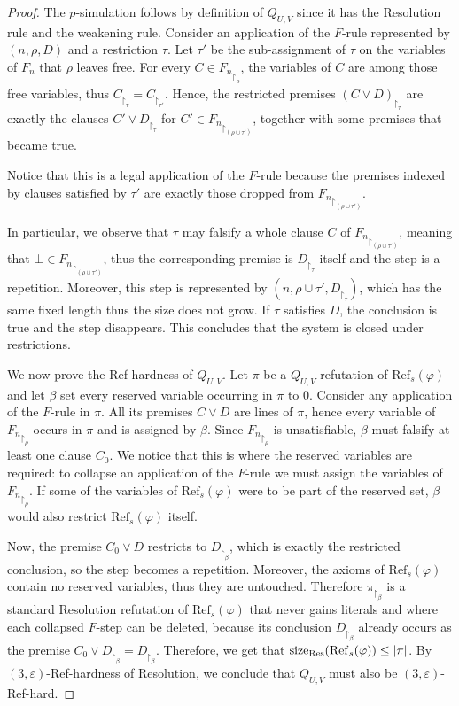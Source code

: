 \begin{proof}
    The $p$-simulation follows by definition of $Q_{U,V}$ since it has the Resolution rule and the weakening rule. Consider an application of the $F$-rule represented by $(n,\rho,D)$ and a restriction $\tau$. Let $\tau'$ be the sub-assignment of $\tau$ on the variables of $F_n$ that $\rho$ leaves free. For every $C\in {F_n}_{\upharpoonright_\rho}$, the variables of $C$ are among those free variables, thus $C_{\upharpoonright_\tau}=C_{\upharpoonright_{\tau'}}$. Hence, the restricted premises $(C \lor D)_{\upharpoonright_\tau}$ are exactly the clauses $C' \lor D _{\upharpoonright_\tau}$ for $C'\in {F_n}_{\upharpoonright_(\rho\cup\tau')}$, together with some premises that became true.
    
    Notice that this is a legal application of the $F$-rule because the premises indexed by clauses satisfied by $\tau'$ are exactly those dropped from ${F_n}_{\upharpoonright_(\rho\cup\tau')}$.
    
    In particular, we observe that $\tau$ may falsify a whole clause $C$ of ${F_n}_{\upharpoonright_(\rho\cup\tau')}$, meaning that $\bot \in {F_n}_{\upharpoonright_(\rho\cup\tau')}$, thus the corresponding premise is $D_{\upharpoonright_\tau}$ itself and the step is a repetition. Moreover, this step is represented by $(n,\rho\cup\tau',D_{\upharpoonright_\tau})$, which has the same fixed length thus the size does not grow. If $\tau$ satisfies $D$, the conclusion is true and the step disappears. This concludes that the system is closed under restrictions.

    We now prove the Ref-hardness of $Q_{U,V}$. Let $\pi$ be a $Q_{U,V}$-refutation of $\mathrm{Ref}_s(\varphi)$ and let $\beta$ set every reserved variable occurring in $\pi$ to $0$. Consider any application of the $F$-rule in $\pi$. All its premises $C\lor D$ are lines of $\pi$, hence every variable of ${F_n}_{\upharpoonright_\rho}$ occurs in $\pi$ and is assigned by $\beta$. Since ${F_n}_{\upharpoonright_\rho}$ is unsatisfiable, $\beta$ must falsify at least one clause $C_0$. We notice that this is where the reserved variables are required: to collapse an application of the $F$-rule we must assign the variables of ${F_n}_{\upharpoonright_\rho}$. If some of the variables of $\mathrm{Ref}_s(\varphi)$ were to be part of the reserved set, $\beta$ would also restrict $\mathrm{Ref}_s(\varphi)$ itself.   
    
    Now, the premise $C_0\lor D$ restricts to $D_{\upharpoonright_\beta}$, which is exactly the restricted conclusion, so the step becomes a repetition. Moreover, the axioms of $\mathrm{Ref}_s(\varphi)$ contain no reserved variables, thus they are untouched. Therefore $\pi_{\upharpoonright_\beta}$ is a standard Resolution refutation of $\mathrm{Ref}_s(\varphi)$ that never gains literals and where each collapsed $F$-step can be deleted, because its conclusion $D_{\upharpoonright_\beta}$ already occurs as the premise $C_0 \lor D_{\upharpoonright_\beta} = D_{\upharpoonright_\beta}$. Therefore, we get that $\mathrm{size}_{\mathrm{Res}}(\mathrm{Ref}_s(\varphi)) \leq \left|\pi\right|$. By $(3,\varepsilon)$-Ref-hardness of Resolution, we conclude that $Q_{U,V}$ must also be $(3,\varepsilon)$-Ref-hard.
\end{proof}

